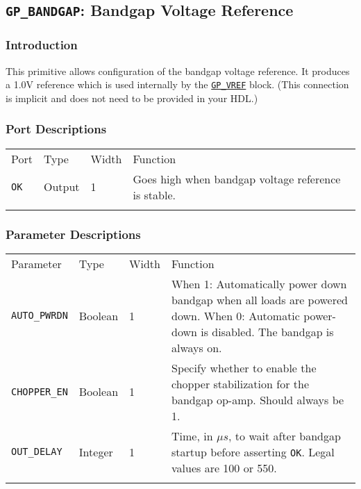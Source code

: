 \documentclass[11pt]{article}
\newcommand{\tokenstyle}[1]{\texttt{#1}}
\newcommand{\whenstyle}[1]{{\fontseries{sb}\selectfont#1}}
\newcommand{\tokenref}[2]{\hyperref[#2]{\tokenstyle{#1}}}
\newcommand{\thinhline}{\Xhline{1\arrayrulewidth}}
\newcommand{\thickhline}{\Xhline{2.5\arrayrulewidth}}
\begin{document}
\pagebreak
\clearpage
\subsection{\tokenstyle{GP\_BANDGAP}: Bandgap Voltage Reference}

\subsubsection{Introduction}
This primitive allows configuration of the bandgap voltage reference. It produces a 1.0V reference which is used 
internally by the \tokenref{GP\_VREF}{gp-vref} block. (This connection is implicit and does not need to be provided in 
your HDL.)

\subsubsection{Port Descriptions}

\begin{tabularx}{\textwidth}{lllX}
\thinhline
\whenstyle{Port} & \whenstyle{Type} & \whenstyle{Width} & \whenstyle{Function} \\
\thickhline
\tokenstyle{OK} & Output & 1 & Goes high when bandgap voltage reference is stable. \\
\thinhline
\end{tabularx}

\subsubsection{Parameter Descriptions}

\begin{tabularx}{\textwidth}{lllX}
\thinhline
\whenstyle{Parameter} & \whenstyle{Type} & \whenstyle{Width} & \whenstyle{Function} \\
\thickhline
\tokenstyle{AUTO\_PWRDN} & Boolean & 1 &
	\whenstyle{When 1:} Automatically power down bandgap when all loads are powered down. \newline
	\whenstyle{When 0:} Automatic power-down is disabled. \newline The bandgap is always on.\\
\thinhline
\tokenstyle{CHOPPER\_EN} & Boolean & 1 &
	Specify whether to enable the chopper stabilization for the bandgap op-amp. Should always be 1. \\
\thinhline
\tokenstyle{OUT\_DELAY} & Integer & 1 &
	Time, in $\mu s$, to wait after bandgap startup before asserting \tokenstyle{OK}. Legal values are 100 or 550.\\
\thinhline
\end{tabularx}
\end{document}
